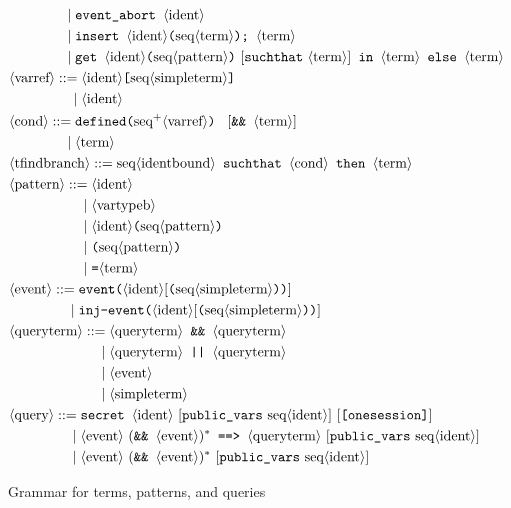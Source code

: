 \begin{figure}
\begin{align*}
&\pht \texttt{event\string_abort }\nonterm{ident}\\
&\pht \texttt{insert }\nonterm{ident}\texttt{(}\seq{term}\texttt{)}\texttt{; }\nonterm{term}\\
&\pht \texttt{get }\nonterm{ident}\texttt{(}\seq{pattern}\texttt{)}\ [\texttt{suchthat}\ \nonterm{term}]\texttt{ in }\nonterm{term}\texttt{ else }\nonterm{term}\\
&\nonterm{varref} ::= \nonterm{ident}\texttt{[}\seq{simpleterm}\texttt{]}\\
&\phantom{\nonterm{varref} =}\mid \nonterm{ident}\\
&\nonterm{cond} ::= \texttt{defined(} \neseq{varref} \texttt{) }\ [\texttt{\&\& }\nonterm{term}]\\
&\phantom{\nonterm{cond} = }\mid \nonterm{term}\\
&\nonterm{tfindbranch} ::= \seq{identbound} \texttt{ suchthat } \nonterm{cond} \texttt{ then }\nonterm{term}\\
&\nonterm{pattern} ::= \nonterm{ident}\\
&\phpat \nonterm{vartypeb}\\
&\phpat \nonterm{ident}\texttt{(} \seq{pattern}\texttt{)}\\
&\phpat \texttt{(} \seq{pattern}\texttt{)}\\
&\phpat \texttt{=} \nonterm{term}\\
&\nonterm{event} ::= \texttt{event(}\nonterm{ident}[\texttt{(}\seq{simpleterm}\texttt{))}]\\
&\phantom{\nonterm{event} =}\mid \texttt{inj-event(}\nonterm{ident}[\texttt{(}\seq{simpleterm}\texttt{))}]\\
&\nonterm{queryterm} ::= \nonterm{queryterm}\texttt{ \&\& }\nonterm{queryterm}\\
&\phqt \nonterm{queryterm}\texttt{ || }\nonterm{queryterm}\\
&\phqt \nonterm{event}\\
&\phqt \nonterm{simpleterm}\\
&\nonterm{query} ::= \texttt{secret }\nonterm{ident}\ [\texttt{public\_vars}\ \seq{ident}]\ [\texttt{[onesession]}]\\
&\phq \nonterm{event}\ (\texttt{\&\& }\nonterm{event})^* \texttt{ ==> }\nonterm{queryterm}\ [\texttt{public\_vars}\ \seq{ident}]\\
&\phq \nonterm{event}\ (\texttt{\&\& }\nonterm{event})^* \ [\texttt{public\_vars}\ \seq{ident}]
\end{align*}
\caption{Grammar for terms, patterns, and queries}
\label{fig:syntax1}
\end{figure}

